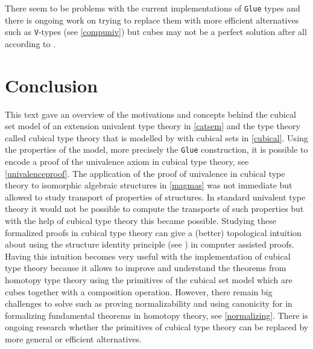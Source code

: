 \documentclass[12pt,a4paper,twoside,xetex]{book} %
\begin{document}
 There seem to be problems with 
the current implementations of \texttt{Glue} types and there is ongoing work on 
trying to replace them with more efficient alternatives such as 
\texttt{V}-types (see \cref{compuniv}) but cubes may not be a perfect solution after all
according to \cite{Cubicalv92:online}.

% 






\chapter*{Conclusion}

This text gave an overview of the motivations and concepts behind the cubical 
set model of an extension univalent type theory in \cref{catsem} and the type 
theory called cubical type theory that is modelled by with cubical sets in 
\cref{cubical}. Using the properties of the model, more precisely the 
\texttt{Glue} construction, it is possible to encode a proof of the univalence 
axiom in cubical type theory, see \cref{univalenceproof}. The application of the 
proof of univalence in cubical type theory to isomorphic algebraic structures in 
\cref{magmas} was not immediate but allowed to study transport of properties of 
structures. In standard univalent type theory it would not be possible to 
compute the transports of such properties but with the help of cubical type 
theory this became possible. Studying these formalized proofs in cubical type 
theory can give a (better) topological intuition about using the structure 
identity principle (see \cite{Aczel2012}) in computer assisted proofs. Having 
this intuition becomes very useful with the implementation of cubical type 
theory because it allows to improve and understand the theorems from homotopy 
type theory using the primitives of the cubical set model which are 
cubes together with a composition operation. However, there remain big challenges to solve such as proving normalizability and 
using canonicity for in formalizing fundamental theorems in homotopy theory, see 
\cref{normalizing}. There is ongoing research whether the primitives of cubical 
type theory can be replaced by more general or efficient alternatives.
\end{document}
